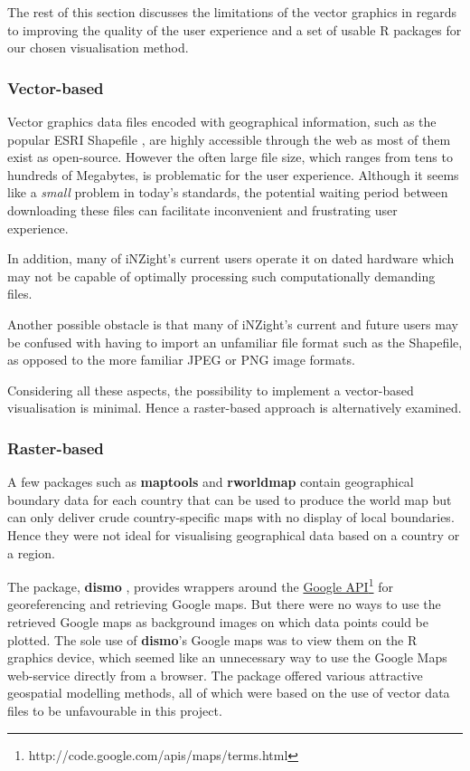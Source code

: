 \documentclass[a4paper, 12pt]{article}
\begin{document}
The rest of this section discusses the limitations of the vector graphics in regards to improving the quality of the user experience and a set of usable R packages for our chosen visualisation method.

\subsubsection*{Vector-based}
Vector graphics data files encoded with geographical information, such as the popular ESRI Shapefile \cite{esri}, are highly accessible through the web as most of them exist as open-source. However the often large file size, which ranges from tens to hundreds of Megabytes, is problematic for the user experience. Although it seems like a \emph{small} problem in today's standards, the potential waiting period between downloading these files can facilitate inconvenient and frustrating user experience.

In addition, many of iNZight's current users operate it on dated hardware which may not be capable of optimally processing such computationally demanding files.

Another possible obstacle is that many of iNZight's current and future users may be confused with having to import an unfamiliar file format such as the Shapefile, as opposed to the more familiar JPEG or PNG image formats.

Considering all these aspects, the possibility to implement a vector-based visualisation is minimal. Hence a raster-based approach is alternatively examined.

\subsubsection*{Raster-based}
A few packages such as \textbf{maptools} \cite{maptools} and \textbf{rworldmap} \cite{rworldmap} contain geographical boundary data for each country that can be used to produce the world map but can only deliver crude country-specific maps with no display of local boundaries. Hence they were not ideal for visualising geographical data based on a country or a region.

The package, \textbf{dismo} \cite{dismo}, provides wrappers around the \href{http://code.google.com/apis/maps/terms.html}{Google API}\footnote{http://code.google.com/apis/maps/terms.html} for georeferencing and retrieving Google maps. But there were no ways to use the retrieved Google maps as background images on which data points could be plotted. The sole use of \textbf{dismo}'s Google maps was to view them on the R graphics device, which seemed like an unnecessary way to use the Google Maps web-service directly from a browser. The package offered various attractive geospatial modelling methods, all of which were based on the use of vector data files to be unfavourable in this project.
\end{document}
